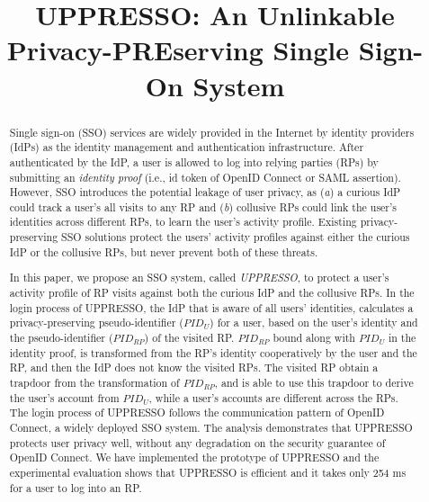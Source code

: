 \documentclass[conference, 10pt]{IEEEtran}
\begin{document}
\title{{UPPRESSO}: An Unlinkable Privacy-PREserving Single Sign-On System}
\maketitle
\begin{abstract}
Single sign-on (SSO) services
     are widely provided in the Internet by identity providers (IdPs) as the identity management
      and authentication infrastructure.
After authenticated by the IdP,
    a user is allowed to log into relying parties (RPs) by submitting an \emph{identity proof}
    (i.e., id token of OpenID Connect or SAML assertion).
However,
    SSO introduces the potential leakage of user privacy,
        as (\emph{a}) a curious IdP could track a user's all visits to any RP
            and (\emph{b}) collusive RPs could link the user's identities across different RPs,
            to learn the user's activity profile.
Existing privacy-preserving SSO solutions protect the users' activity profiles
    against either the curious IdP or the collusive RPs, but never prevent both of these threats.

In this paper, we propose an SSO system, called \emph{UPPRESSO},
     to protect a user's activity profile of RP visits
        against both the curious IdP and the collusive RPs.
In the login process of UPPRESSO,
 the IdP that is aware of all users' identities,
         calculates a privacy-preserving pseudo-identifier ($PID_U$) for a user,
    based on the user's identity and the pseudo-identifier ($PID_{RP}$) of the visited RP.
$PID_{RP}$ bound along with $PID_U$ in the identity proof,
   is transformed from the RP's identity cooperatively by the user and the RP,
    and then the IdP does not know the visited RPs.
The visited RP obtain a trapdoor from the transformation of $PID_{RP}$,
    and is able to use this trapdoor to derive the user's account from $PID_U$,
 while a user's accounts are different across the RPs.
The login process of UPPRESSO follows the communication pattern of OpenID Connect, a widely deployed SSO system.
The analysis demonstrates that UPPRESSO protects user privacy well, without any degradation on the security guarantee of OpenID Connect.
We have implemented the prototype of UPPRESSO and
 the experimental evaluation shows that UPPRESSO is efficient and
  it takes only 254 ms for a user to log into an RP.
\end{abstract}
\end{document}
